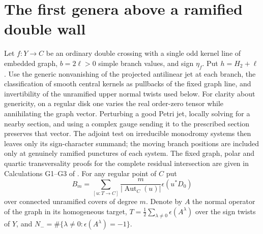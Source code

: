 \section{The first genera above a ramified double wall}\label{sec:quartic}
Let \(f:Y\to C\) be an ordinary double crossing with a single odd kernel line of embedded graph, \(b=2\ell>0\) simple branch values, and sign \(\eta_f\). Put \(h=H_2+\ell\). Use the generic nonvanishing of the projected antilinear jet at each branch, the classification of smooth central kernels as pullbacks of the fixed graph line, and invertibility of the unramified upper normal twists used below. For clarity about genericity, on a regular disk one varies the real order-zero tensor while annihilating the graph vector. Perturbing a good Petri jet, locally solving for a nearby section, and using a complex gauge sending it to the prescribed section preserves that vector. The adjoint test on irreducible monodromy systems then leaves only its sign-character summand; the moving branch positions are included only at genuinely ramified punctures of each system. The fixed graph, polar and quartic transversality proofs for the complete residual intersection are given in Calculations G1--G3 of \cite{WueSupplement}.
For any regular point of \(C\) put
\[
 B_m=\sum_{[u:T\to C]}\frac{m}{|\operatorname{Aut}_C(u)|}\epsilon(u^*D_0)
\]
over connected unramified covers of degree \(m\). Denote by \(A\) the normal operator of the graph in its homogeneous target, \(T=\tfrac12\sum_{\lambda\ne0}\epsilon(A^\lambda)\) over the sign twists of \(Y\), and \(N_-=\#\{\lambda\ne0:\epsilon(A^\lambda)=-1\}\).

